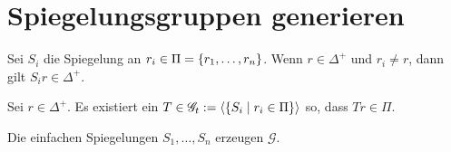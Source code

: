 \documentclass{handout}
\begin{document}
\section{Spiegelungsgruppen generieren}
\begin{satz}
    Sei \( S_i \) die Spiegelung an 
    \( r_i \in \Pi = \{r_1, \ldots, r_n\} \).
    Wenn \( r \in \Delta^+ \) und \( r_i \neq r \), 
    dann gilt \( S_i r \in \Delta^+ \).
\end{satz}
\begin{satz}
    Sei \( r \in \Delta^+ \). Es existiert ein \( T \in 
    \mathscr{G}_t := \langle 
    \{S_i \;\vert\; r_i \in \Pi\} \rangle \) so, dass 
    \( Tr \in \Pi \).
\end{satz}

\begin{satz}
    Die einfachen Spiegelungen \( S_1, \ldots, S_n \) 
    erzeugen \( \mathscr{G} \).
\end{satz}

\makeliteratur{}
\end{document}
